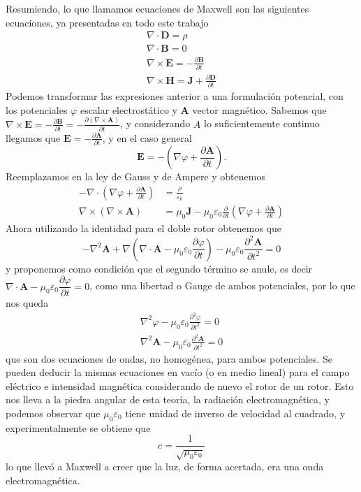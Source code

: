 \documentclass[11pt,a4paper]{article}
\numberwithin{equation}{section}
\begin{document}
Resumiendo, lo que llamamos ecuaciones de Maxwell son las siguientes ecuaciones, ya presentadas en todo este trabajo
\begin{align}
    \nabla \cdot \textbf{D} = \rho\\
    \nabla \cdot \textbf{B} = 0\\
    \nabla \times \textbf{E} = -\frac{\partial \textbf{B}}{\partial t}\\
    \nabla \times \textbf{H} = \textbf{J} + \frac{\partial \textbf{D}}{\partial t}
    \label{eq:em_maxwell}
\end{align}
Podemos transformar las expresiones anterior a una formulación potencial, con los potenciales $\varphi$ escalar electrostático y $\textbf{A}$ vector magnético. Sabemos que $\nabla \times \textbf{E} = -\frac{\partial \textbf{B}}{\partial t} = - \frac{\partial (\nabla \times \textbf{A})}{\partial t}$, y considerando $A$ lo suficientemente continuo llegamos que $\textbf{E} = - \frac{\partial \textbf{A}}{\partial t}$, y en el caso general \[    \textbf{E} = - (\nabla \varphi + \frac{\partial \textbf{A}}{\partial t}).\] Reemplazamos en la ley de Gauss y de Ampere y obtenemos 
\begin{align*}
    - \nabla \cdot \left(\nabla \varphi + \frac{\partial \textbf{A}}{\partial t}\right) &= \frac{\rho}{\varepsilon_0}\\
    \nabla \times (\nabla \times \textbf{A}) &= \mu_0 \textbf{J} - \mu_0\varepsilon_0\frac{\partial}{\partial t} \left(\nabla \varphi + \frac{\partial \textbf{A}}{\partial t}\right)
\end{align*}
Ahora utilizando la identidad para el doble rotor obtenemos que \[- \nabla^2 \textbf{A} + \nabla \left(\nabla \cdot \textbf{A} - \mu_0\varepsilon_0 \frac{\partial \varphi}{\partial t}\right) - \mu_0\varepsilon_0 \frac{\partial^2 \textbf{A}}{\partial t^2} = 0\] y proponemos como condición que el segundo término se anule, es decir $\nabla \cdot \textbf{A} - \mu_0\varepsilon_0 \dfrac{\partial \varphi}{\partial t} = 0$, como una libertad o Gauge de ambos potenciales, por lo que nos queda
\begin{align}
    \nabla^2\varphi - \mu_0\varepsilon_0\frac{\partial^2 \varphi}{\partial t^2} = 0\\
    \nabla^2\textbf{A} - \mu_0\varepsilon_0\frac{\partial^2 \textbf{A}}{\partial t^2} = 0
    \label{eq:em_potenciales_ec_onda}
\end{align}
que son dos ecuaciones de ondas, no homogénea, para ambos potenciales. Se pueden deducir la mismas ecuaciones en vacío (o en medio lineal) para el campo eléctrico e intensidad magnética considerando de nuevo el rotor de un rotor. Esto nos lleva a la piedra angular de esta teoría, la radiación electromagnética, y podemos observar que $\mu_0\varepsilon_0$ tiene unidad de inverso de velocidad al cuadrado, y experimentalmente se obtiene que 
\begin{equation}
    c = \frac{1}{\sqrt{\mu_0\varepsilon_0}}
    \label{eq:em_velocidad_luz}
\end{equation}
lo que llevó a Maxwell a creer que la luz, de forma acertada, era una onda electromagnética. 
\end{document}
